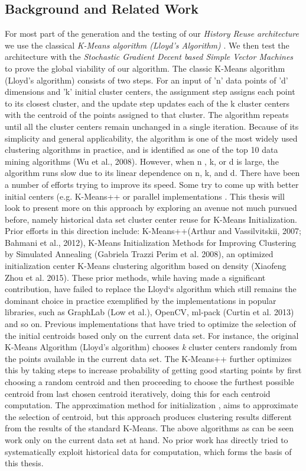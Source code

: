 \documentclass{vldb}
\begin{document}
\subsection{Background and Related Work}
For most part of the generation and the testing of our \textit{History Reuse architecture} we use the classical \textit{K-Means algorithm (Lloyd's Algorithm)}\cite{kmeans_orig} . We then test the architecture with the \textit{Stochastic Gradient Decent based Simple Vector Machines}\cite{sgd_svm} to prove the global viability of our algorithm.
The classic K-Means algorithm (Lloyd’s algorithm) consists of two steps. For an input of 'n' data points of 'd' dimensions and 'k' initial cluster centers, the assignment step assigns each point to its closest cluster, and the update step updates each of the k cluster centers with the centroid of the points assigned to that cluster. The algorithm repeats until all the cluster centers remain unchanged in a single iteration.
Because of its simplicity and general applicability, the algorithm is one of the most widely used clustering algorithms in practice, and is identified as one of the top 10 data mining algorithms (Wu et al., 2008). However, when n , k, or d is large, the algorithm runs slow due to its linear dependence on n, k, and d. There have been a number of efforts trying to improve its speed. Some try to come up with better initial centers (e.g. K-Means{++} \cite{kmeans++} or parallel implementations \cite{kmens_parellel}. This thesis will look to present more on this approach by exploring an avenue not much pursued before, namely historical data set cluster center reuse for K-Means Initialization. 
Prior efforts in this direction include: K-Means{++}(Arthur and Vassilvitskii, 2007; Bahmani et al., 2012), K-Means Initialization Methods for Improving Clustering by Simulated Annealing (Gabriela Trazzi Perim et al. 2008), an optimized initialization center K-Means clustering algorithm based on density (Xiaofeng Zhou et al. 2015). These prior methods, while having made a significant contribution, have failed to replace the Lloyd`s algorithm which still remains the dominant choice in practice exemplified by the implementations in popular libraries, such as GraphLab (Low et al.), OpenCV, ml-pack (Curtin et al. 2013) and so on.
Previous implementations that have tried to optimize the selection of the initial centroids based only on the current data set. For instance, the original K-Means Algorithm (Lloyd’s algorithm) chooses \textit{k} cluster centers randomly from the points available in the current data set. The K-Means{++} \cite{kmeans++} further optimizes this by taking steps to increase probability of getting good starting points by first choosing a random centroid and then proceeding to choose the furthest possible centroid from last chosen centroid iteratively, doing this for each centroid computation. The approximation method for initialization \cite{approx_meth}, aims to approximate the selection of centroid, but this approach produces clustering results different from the results of the standard K-Means. The above algorithms as can be seen work only on the current data set at hand. No prior work has directly tried to systematically exploit historical data for computation, which forms the basis of this thesis.
\end{document}
